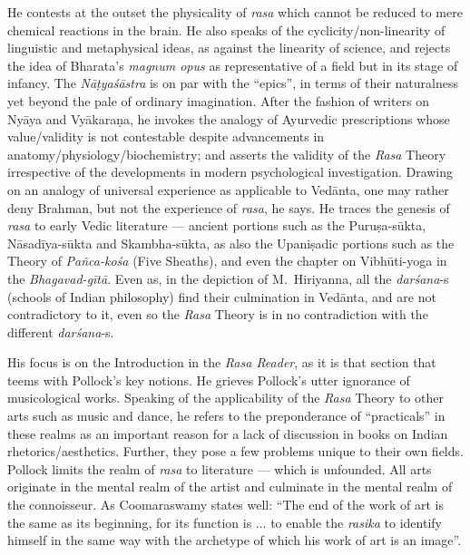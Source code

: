 He contests at the outset the physicality of \textsl{rasa} which cannot be reduced to mere chemical reactions in the brain. He also speaks of the cyclicity/non-linearity of linguistic and metaphysical ideas, as against the linearity of science, and rejects the idea of Bharata’s \textsl{magnum opus} as representative of a field but in its stage of infancy. The \textsl{Nāṭyaśāstra} is on par with the “epics”, in terms of their naturalness yet beyond the pale of ordinary imagination. After the fashion of writers on Nyāya and Vyākaraṇa, he invokes the analogy of Ayurvedic prescriptions whose value/validity is not contestable despite advancements in anatomy/physiology/biochemistry; and asserts the validity of the \textsl{Rasa} Theory irrespective of the developments in modern psychological investigation. Drawing on an analogy of universal experience as applicable to Vedānta, one may rather deny Brahman, but not the experience of \textsl{rasa}, he says. He traces the genesis of \textsl{rasa} to early Vedic literature --- ancient portions such as the Puruṣa-sūkta, Nāsadīya-sūkta and Skambha-sūkta, as also the Upaniṣadic portions such as the Theory of \textsl{Pañca-kośa} (Five Sheaths), and even the chapter on Vibhūti-yoga in the \textsl{Bhagavad-gītā}. Even as, in the depiction of M.\ Hiriyanna, all the \textsl{darśana}-s (schools of Indian philosophy) find their culmination in Vedānta, and are not contradictory to it, even so the \textsl{Rasa} Theory is in no contradiction with the different \textsl{darśana}-s.

His focus is on the Introduction in the \textsl{Rasa Reader}, as it is that section that teems with Pollock’s key notions. He grieves Pollock’s utter ignorance of musicological works. Speaking of the applicability of the \textsl{Rasa} Theory to other arts such as music and dance, he refers to the preponderance of “practicals” in these realms as an important reason for a lack of discussion in books on Indian rhetorics/aesthetics. Further, they pose a few problems unique to their own fields. Pollock limits the realm of \textsl{rasa} to literature --- which is unfounded. All arts originate in the mental realm of the artist and culminate in the mental realm of the connoisseur. As Coomaraswamy states well: “The end of the work of art is the same as its beginning, for its function is ... to enable the \textsl{rasika} to identify himself in the same way with the archetype of which his work of art is an image”.

